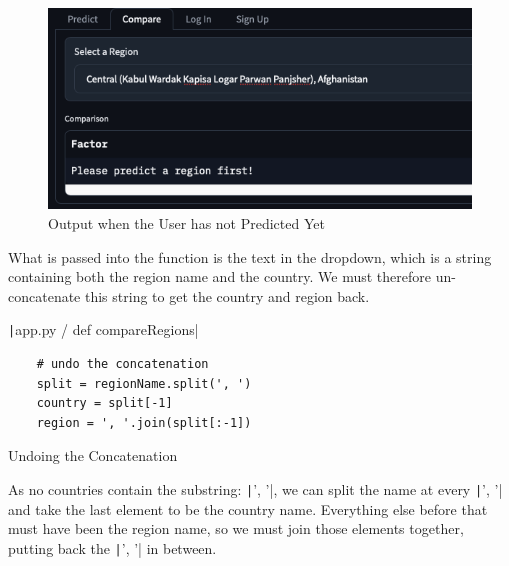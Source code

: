 \documentclass[12pt]{report}
\newcommand{\pil}[1]{\protect\texttt|#1|}
\begin{document}
\begin{figure}[H]
\centering
\includegraphics[width=12cm]{ss17.4.png}
\caption{Output when the User has not Predicted Yet}\label{fig:ss17.4}
\end{figure}

\begin{center}
\end{center}

What is passed into the function is the text in the dropdown, which is a string containing both the region name and the country. We must therefore un-concatenate this string to get the country and region back.

\begin{listing}[H]
\pil{app.py / def compareRegions}
\begin{verbatim}
    # undo the concatenation
    split = regionName.split(', ')
    country = split[-1]
    region = ', '.join(split[:-1])
\end{verbatim}
\caption{Undoing the Concatenation}\label{cs:undoConcat}
\end{listing}

As no countries contain the substring: \pil{', '}, we can split the name at every \pil{', '} and take the last element to be the country name. Everything else before that must have been the region name, so we must join those elements together, putting back the \pil{', '} in between.
\end{document}
